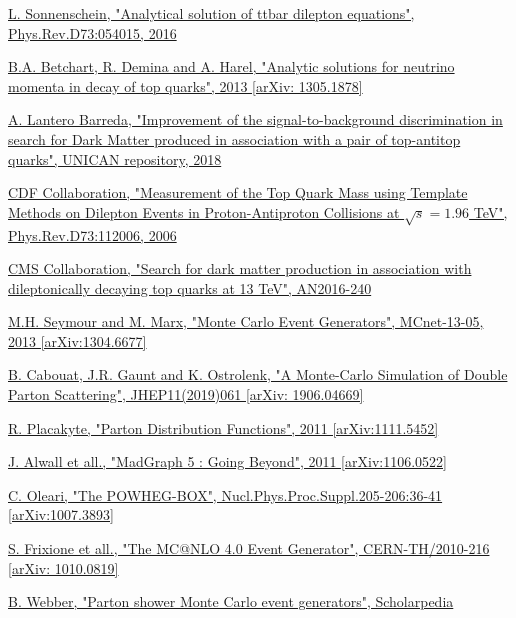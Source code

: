 \documentclass[a4paper, 10pt, openright]{report}
\begin{document}
\begin{thebibliography}{1}
\href{https://arxiv.org/abs/hep-ph/0603011}{L. Sonnenschein,
"Analytical solution of ttbar dilepton equations",
Phys.Rev.D73:054015, 2016}

\href{https://arxiv.org/pdf/1305.1878.pdf}{B.A. Betchart, R. Demina and A. Harel,
"Analytic solutions for neutrino momenta in decay of top quarks",
2013 [arXiv: 1305.1878]}

\href{https://repositorio.unican.es/xmlui/bitstream/handle/10902/15648/Lantero\%20Barreda\%20Agustin.pdf}{A. Lantero Barreda,
"Improvement of the signal-to-background discrimination in search for Dark Matter produced in association with a pair of top-antitop quarks",
UNICAN repository, 2018}

\href{https://arxiv.org/abs/hep-ex/0602008}{CDF Collaboration,
"Measurement of the Top Quark Mass using Template Methods on Dilepton Events in Proton-Antiproton Collisions at $\sqrt{s} = 1.96$ TeV",
Phys.Rev.D73:112006, 2006}

\href{http://cms.cern.ch/iCMS/user/noteinfo?cmsnoteid=CMS\%20AN-2016/240}{CMS Collaboration,
"Search for dark matter production in association with dileptonically decaying top quarks at 13 TeV", AN2016-240}

\href{https://arxiv.org/abs/1304.6677}{M.H. Seymour and M. Marx,
"Monte Carlo Event Generators",
MCnet-13-05, 2013 [arXiv:1304.6677]}

\href{https://arxiv.org/abs/1906.04669}{B. Cabouat, J.R. Gaunt and K. Ostrolenk,
"A Monte-Carlo Simulation of Double Parton Scattering",
JHEP11(2019)061 [arXiv: 1906.04669]}

\href{https://arxiv.org/abs/1111.5452}{R. Placakyte,
"Parton Distribution Functions",
2011 [arXiv:1111.5452]}

\href{https://arxiv.org/abs/1106.0522}{J. Alwall et all.,
"MadGraph 5 : Going Beyond",
2011 [arXiv:1106.0522]}

\href{https://arxiv.org/abs/1007.3893}{C. Oleari,
"The POWHEG-BOX",
Nucl.Phys.Proc.Suppl.205-206:36-41 [arXiv:1007.3893]}

\href{https://arxiv.org/abs/1010.0819}{S. Frixione et all.,
"The MC@NLO 4.0 Event Generator",
CERN-TH/2010-216 [arXiv: 1010.0819]}

\href{http://www.scholarpedia.org/article/Parton_shower_Monte_Carlo_event_generators}{B. Webber,
"Parton shower Monte Carlo event generators",
Scholarpedia}


\end{thebibliography}
\end{document}
